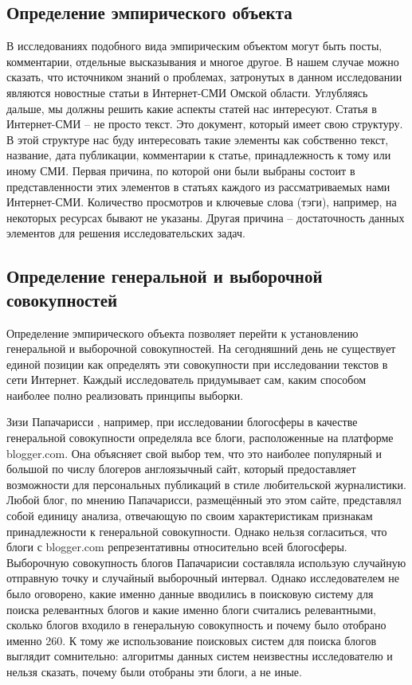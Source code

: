 \subsection{Определение эмпирического объекта} 

В исследованиях подобного вида эмпирическим объектом могут быть посты, комментарии, отдельные высказывания и многое другое. В нашем случае можно сказать, что источником знаний о проблемах, затронутых в данном исследовании являются новостные статьи в Интернет-СМИ Омской области. Углубляясь дальше, мы должны решить какие аспекты статей нас интересуют. Статья в Интернет-СМИ -- не просто текст. Это документ, который имеет свою структуру. В этой структуре нас буду интересовать такие элементы как собственно текст, название, дата публикации, комментарии к статье, принадлежность к тому или иному СМИ. Первая причина, по которой они были выбраны состоит в представленности этих элементов в статьях каждого из рассматриваемых нами Интернет-СМИ. Количество просмотров и ключевые слова (тэги), например, на некоторых ресурсах бывают не указаны. Другая причина -- достаточность данных элементов для решения исследовательских задач.

\subsection{Определение генеральной и выборочной совокупностей}

Определение эмпирического объекта позволяет перейти к установлению генеральной и выборочной совокупностей. На сегодняшний день не существует единой позиции как определять эти совокупности при исследовании текстов в сети Интернет. Каждый исследователь придумывает сам, каким способом наиболее полно реализовать принципы выборки.

Зизи Папачарисси \cite{zizi}, например, при исследовании блогосферы в качестве генеральной совокупности определяла все блоги, расположенные на платформе blogger.com. Она объясняет свой выбор тем, что это наиболее популярный и большой по числу блогеров англоязычный сайт, который предоставляет возможности для персональных публикаций в стиле любительской журналистики. Любой блог, по мнению Папачарисси, размещённый это этом сайте, представлял собой единицу анализа, отвечающую по своим характеристикам признакам принадлежности к генеральной совокупности. Однако нельзя согласиться, что блоги с blogger.com репрезентативны относительно всей блогосферы. Выборочную совокупность блогов Папачарисии составляла использую случайную отправную точку и случайный выборочный интервал. Однако исследователем не было оговорено, какие именно данные вводились в поисковую систему для поиска релевантных блогов и какие именно блоги считались релевантными, сколько блогов входило в генеральную совокупность и почему было отобрано именно 260. К тому же использование поисковых систем для поиска блогов выглядит сомнительно: алгоритмы данных систем неизвестны исследователю и нельзя сказать, почему были отобраны эти блоги, а не иные.


